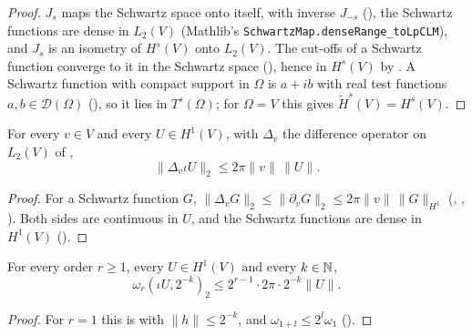 \begin{proof}
\leanok
$J_s$ maps the Schwartz space onto itself, with inverse $J_{-s}$
(), the Schwartz functions are dense in $L_2(V)$ (Mathlib's
\texttt{SchwartzMap.\allowbreak denseRange\_\allowbreak toLpCLM}), and $J_s$ is an isometry of
$H^s(V)$ onto $L_2(V)$. The cut-offs of a Schwartz function converge to it in the Schwartz space
(), hence in $H^s(V)$ by . A
Schwartz function with compact support in $\Omega$ is $a + i b$ with real test functions
$a, b \in \mathcal D(\Omega)$ (), so it lies in
$T^s(\Omega)$; for $\Omega = V$ this gives $\tilde H^s(V) = H^s(V)$.
\end{proof}

\begin{lemma}[Differences in $H^1(V)$]
\label{lem:sobolev-one-differences}
\leanok
{}
For every $v \in V$ and every $U \in H^1(V)$, with $\Delta_v$ the difference operator on $L_2(V)$ of
,
\[
  \|\Delta_v \iota U\|_2 \leq 2\pi \|v\| \, \|U\| .
\]
\end{lemma}

\begin{proof}
\leanok
For a Schwartz function $G$,
$\|\Delta_v G\|_2 \leq \|\partial_v G\|_2 \leq 2\pi \|v\| \, \|G\|_{H^1}$
(, ,
). Both sides are continuous in $U$, and the
Schwartz functions are dense in $H^1(V)$ ().
\end{proof}

\begin{lemma}
\label{lem:modulus-h1-bound}
\leanok
{}
For every order $r \geq 1$, every $U \in H^1(V)$ and every $k \in \mathbb{N}$,
\[
  \omega_r(\iota U, 2^{-k})_2 \leq 2^{r-1} \cdot 2\pi \cdot 2^{-k} \|U\| .
\]
\end{lemma}

\begin{proof}
\leanok
For $r = 1$ this is  with $\|h\| \leq 2^{-k}$, and
$\omega_{1 + l} \leq 2^l \omega_1$ ().
\end{proof}

